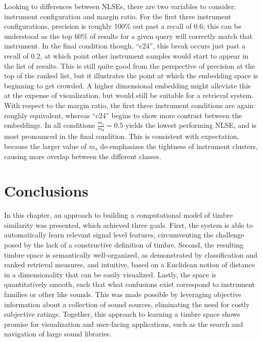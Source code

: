 Looking to differences between NLSEs, there are two variables to consider: instrument configuration and margin ratio.
For the first three instrument configurations, precision is roughly 100\% out past a recall of 0.6;
this can be understood as the top 60\% of results for a given query will correctly match that instrument.
In the final condition though, ``c24'', this break occurs just past a recall of 0.2, at which point other instrument samples would start to appear in the list of results.
This is still quite good from the perspective of precision at the top of the ranked list, but it illustrates the point at which the embedding space is beginning to get crowded.
A higher dimensional embedding might alleviate this at the expense of visualization, but would still be suitable for a retrieval system.
With respect to the margin ratio, the first three instrument conditions are again roughly equivalent, whereas ``c24'' begins to show more contrast between the embeddings.
In all conditions $\frac{m_s}{m_d} = 0.5$ yields the lowest performing NLSE, and is most pronounced in the final condition.
This is consistent with expectation, because the larger value of $m_s$ de-emphasizes the tightness of instrument clusters, causing more overlap between the different classes.


\section{Conclusions}
\label{sec:conclusions}

In this chapter, an approach to building a computational model of timbre similarity was presented, which achieved three goals.
First, the system is able to automatically learn relevant signal level features, circumventing the challenge posed by the lack of a constructive definition of timbre.
Second, the resulting timbre space is semantically well-organized, as demonstrated by classification and ranked retrieval measures, and intuitive, based on a Euclidean notion of distance in a dimensionality that can be easily visualized.
Lastly, the space is quantitatively smooth, such that what confusions exist correspond to instrument families or other like sounds.
This was made possible by leveraging objective information about a collection of sound sources, eliminating the need for costly subjective ratings.
Together, this approach to learning a timbre space shows promise for visualization and user-facing applications, such as the search and navigation of large sound libraries.

